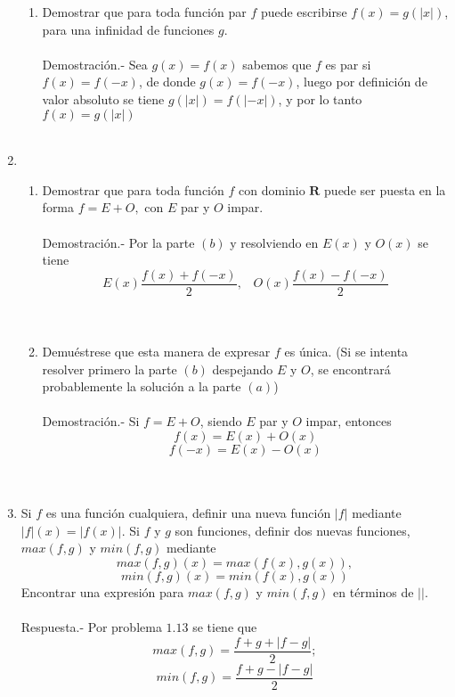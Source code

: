 \begin{enumerate}
\begin{enumerate}[\bfseries (a)]
	    \item Demostrar que para toda función par $f$ puede escribirse $f(x)=g(|x|)$, para una infinidad de funciones $g$.\\\\
	    Demostración.-\; Sea $g(x)=f(x)$ sabemos que $f$ es par si $f(x)=f(-x)$, de donde $g(x)=f(-x)$, luego  por definición de valor absoluto se tiene $g(|x|)=f(|-x|)$, y por lo tanto $f(x)=g(|x|)$\\\\

	\end{enumerate}

	\item 
	\begin{enumerate}[\bfseries (a)]

	    \item Demostrar que para toda función $f$ con dominio $\mathbf{R}$ puede ser puesta en la forma $f=E+O,$ con $E$ par y $O$ impar.\\\\
	    Demostración.-\; Por la parte $(b)$ y resolviendo en $E(x)$ y $O(x)$ se tiene $$E(x)\dfrac{f(x)+f(-x)}{2}, \;\;\; O(x)\dfrac{f(x)-f(-x)}{2}$$\\\\

	    \item Demuéstrese que esta manera de expresar $f$ es única. (Si se intenta resolver primero la parte $(b)$ despejando $E$ y $O$, se encontrará probablemente la solución a la parte $(a)$)\\\\
	    Demostración.-\; Si $f=E+O$, siendo $E$ par y $O$ impar, entonces $$f(x)=E(x)+O(x)$$ $$f(-x)=E(x)-O(x)$$\\\\

	\end{enumerate}

	\item Si $f$ es una función cualquiera, definir una nueva función $|f|$ mediante $|f|(x)=|f(x)|$. Si $f$ y $g$ son funciones, definir dos nuevas funciones, $max(f,g)$ y $min(f,g)$ mediante $$max(f,g)(x)=max(f(x),g(x)),$$ $$min(f,g)(x)=min(f(x),g(x))$$ Encontrar una expresión para $max(f,g)$ y $min(f,g)$ en términos de $| |$.\\\\
	Respuesta.-\; Por problema $1.13$ se tiene que $$max(f,g)=\dfrac{f+g+|f-g|}{2};$$ $$min(f,g)=\dfrac{f+g-|f-g|}{2}$$\\\\


\end{enumerate}
